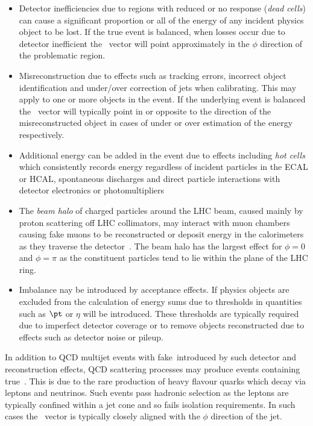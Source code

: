 \begin{itemize}
\item Detector inefficiencies due to regions with reduced or no response (\emph{dead cells}) can cause 
a significant proportion or all of the energy of any incident physics object to be lost. If the true event 
is balanced, when losses occur due to detector inefficient the \met~vector will point approximately in the
$\phi$ direction of the problematic region.
\item Misreconstruction due to effects such as tracking errors, incorrect object identification and
under/over correction of jets when calibrating. This may apply to one or more objects in the event. If the 
underlying event is balanced the \met~vector will typically point in or opposite to the direction 
of the misreconstructed object in cases of under or over estimation of the energy respectively.
\item Additional energy can be added in the event due to effects including \emph{hot cells} which consistently records energy 
regardless of incident particles in the ECAL or HCAL, spontaneous discharges and direct particle interactions with detector
electronics or photomultipliers
\item The \emph{beam halo} of charged particles around the LHC beam, caused mainly by proton scattering off LHC collimators, 
may interact with muon chambers causing fake muons to be reconstructed or deposit energy in the calorimeters as they traverse 
the detector~\cite{beam_halo}. The beam halo has the largest effect for $\phi = 0$ and $\phi=\pi$ as the constituent particles
tend to lie within the plane of the LHC ring.
\item Imbalance nay be introduced by acceptance effects. If physics objects are excluded from the calculation
of energy sums due to thresholds in quantities such as $\pt$ or $\eta$ \met will be introduced. These thresholds are typically 
required due to imperfect detector coverage or to remove objects reconstructed due to effects such as detector 
noise or pileup.
\end{itemize}
In addition to QCD multijet events with fake~\met introduced by such detector and reconstruction effects,
QCD scattering processes may produce events containing true~\met. This is due to the rare production of heavy flavour 
quarks which decay via leptons and neutrinos. Such events pass hadronic selection as the leptons
are typically confined within a jet cone and so fails isolation requirements. In such cases the \met~vector
is typically closely aligned with the $\phi$ direction of the jet.

